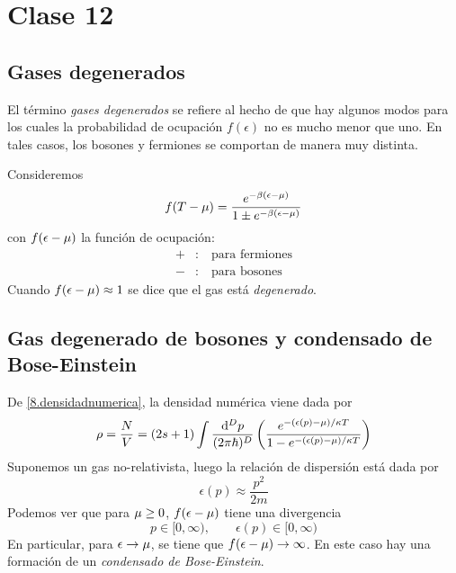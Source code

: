 \section{Clase 12}
\subsection{Gases degenerados}
El término \textit{gases degenerados} se refiere al hecho de que hay algunos modos para los cuales la probabilidad de ocupación $f(\epsilon)$ no es mucho menor que uno. En tales casos, los bosones y fermiones se comportan de manera muy distinta.

Consideremos
\begin{equation}
  f(T-\mu )=\frac{e^{-\beta (\epsilon-\mu )}}{1\pm e^{-\beta (\epsilon-\mu )}}
\end{equation}
con $f(\epsilon-\mu )$ la función de ocupación:
\begin{align}
  +&:\quad \text{para fermiones}\\
  -&:\quad \text{para bosones}
\end{align}
Cuando $f(\epsilon-\mu )\approx 1$ se dice que el gas está \textit{degenerado}.

\subsection{Gas degenerado de bosones y condensado de Bose-Einstein}
De \eqref{8.densidadnumerica}, la densidad numérica viene dada por
\begin{equation}
  \rho=\frac{N}{V}=(2s+1)\int \frac{\dd^Dp}{(2\pi \hbar)^D}\left(\frac{e^{-(\epsilon(p)-\mu)/\kappa T }}{1-e^{-(\epsilon(p)-\mu )/\kappa T}}\right)
\end{equation}
Suponemos un gas no-relativista, luego la relación de dispersión está dada por
\begin{equation}
  \epsilon(p)\approx \frac{p^2}{2m}
\end{equation}
Podemos ver que para $\mu \geq 0$, $f(\epsilon-\mu )$ tiene una divergencia
\begin{equation}
  p\in [0,\infty),\qquad \epsilon(p)\in [0,\infty)
\end{equation}
En particular, para $\epsilon\to \mu $, se tiene que $f(\epsilon-\mu )\to \infty$. En este caso hay una formación de un \textit{condensado de Bose-Einstein}.

